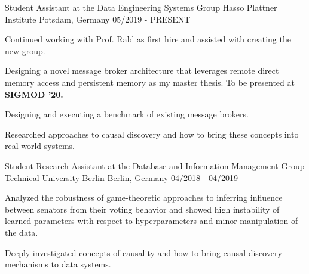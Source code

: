 

\begin{cventries}

  \cventry
    {Student Assistant at the Data Engineering Systems Group} %
    {Hasso Plattner Institute} %
    {Potsdam, Germany} %
    {05/2019 - PRESENT} %
    {
      \begin{cvitems} %
      \item{Continued working with Prof. Rabl as first hire and assisted with creating the new group.}
      \item{Designing a novel message broker architecture that leverages remote direct memory access and persistent memory as my master thesis. To be presented at \textbf{SIGMOD '20.}}
      \item{Designing and executing a benchmark of existing message brokers.}
      \item{Researched approaches to causal discovery and how to bring these concepts into real-world systems.}
      \end{cvitems}
    }

  \cventry
    {Student Research Assistant at the Database and Information Management Group} %
    {Technical University Berlin} %
    {Berlin, Germany} %
    {04/2018 - 04/2019} %
    {
      \begin{cvitems} %
      \item{Analyzed the robustness of game-theoretic approaches to inferring influence between senators from their voting behavior and showed high instability of learned parameters with respect to hyperparameters and minor manipulation of the data.}
      \item{Deeply investigated concepts of causality and how to bring causal discovery mechanisms to data systems.}
      \end{cvitems}
    }


\end{cventries}
